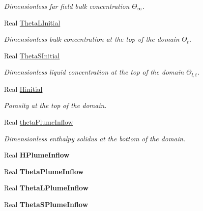 \begin{DoxyCompactItemize}
\begin{DoxyCompactList}\small\item\em Dimensionless far field bulk concentration $ \Theta_\infty $. \end{DoxyCompactList}\item 
Real \hyperlink{class_mushy_layer_params_a3781f0d56c7054c5f28a7004324a0891}{Theta\-L\-Initial}
\begin{DoxyCompactList}\small\item\em Dimensionless bulk concentration at the top of the domain $ \Theta_t $. \end{DoxyCompactList}\item 
Real \hyperlink{class_mushy_layer_params_a71937d2796fc2c061fc8b4781355fd00}{Theta\-S\-Initial}
\begin{DoxyCompactList}\small\item\em Dimensionless liquid concentration at the top of the domain $ \Theta_{l,t} $. \end{DoxyCompactList}\item 
Real \hyperlink{class_mushy_layer_params_ab2e1279e2b97f6b6bfbd79aef9f4fd07}{Hinitial}
\begin{DoxyCompactList}\small\item\em Porosity at the top of the domain. \end{DoxyCompactList}\item 
Real \hyperlink{class_mushy_layer_params_abd2acb1163b9a8660abea009ecbc2a09}{theta\-Plume\-Inflow}
\begin{DoxyCompactList}\small\item\em Dimensionless enthalpy solidus at the bottom of the domain. \end{DoxyCompactList}\item 
\hypertarget{class_mushy_layer_params_ae3cbbe4b6c0ac5438a2c753d615e175e}{Real {\bfseries H\-Plume\-Inflow}}\label{class_mushy_layer_params_ae3cbbe4b6c0ac5438a2c753d615e175e}

\item 
\hypertarget{class_mushy_layer_params_a20062da3b7047b0f9fc5a3f5d320499c}{Real {\bfseries Theta\-Plume\-Inflow}}\label{class_mushy_layer_params_a20062da3b7047b0f9fc5a3f5d320499c}

\item 
\hypertarget{class_mushy_layer_params_ab0d16dc81fb443313e427b11ff37a83d}{Real {\bfseries Theta\-L\-Plume\-Inflow}}\label{class_mushy_layer_params_ab0d16dc81fb443313e427b11ff37a83d}

\item 
\hypertarget{class_mushy_layer_params_a70175dbbe59391b96e645b6177299f46}{Real {\bfseries Theta\-S\-Plume\-Inflow}}\label{class_mushy_layer_params_a70175dbbe59391b96e645b6177299f46}


\end{DoxyCompactItemize}
